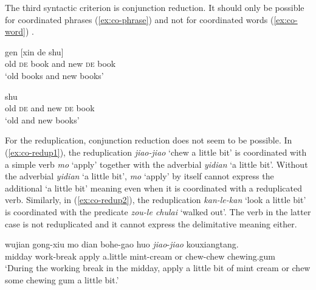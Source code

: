 The third syntactic criterion is conjunction reduction. It should only be possible for coordinated phrases (\ref{ex:co-phrase}) and not for coordinated words (\ref{ex:co-word}) \citetext{\citealp[137]{Duanmu1998}; \citealp[283]{Schaefer2009}}.

\settowidth{}

\ea\label{ex:co-phrase}
  \ea {} gen [xin de shu]\\
  old \textsc{de} book and new \textsc{de} book\\ 
  \glt `old books and new books'
  
  \ex {} shu\\
  old \textsc{de} and new \textsc{de} book\\ 
  \glt `old and new books'
   \z
\z

\ea\label{ex:co-word}
  
  \z
\z

For the reduplication, conjunction reduction does not seem to be possible. 
In (\ref{ex:co-redup1}), the reduplication \textit{jiao-jiao} `chew a little bit' is coordinated with a simple verb \textit{mo} `apply' together with the adverbial \textit{yidian} `a little bit'.
Without the adverbial \textit{yidian} `a little bit', \textit{mo} `apply' by itself cannot express the additional `a little bit' meaning even when it is coordinated with a reduplicated verb.
Similarly, in (\ref{ex:co-redup2}), the reduplication \textit{kan-le-kan} `look a little bit' is coordinated with the predicate \textit{zou-le chulai} `walked out'. The verb in the latter case is not reduplicated and it cannot express the delimitative meaning either.

\settowidth{}

\ea
  \ea\label{ex:co-redup1}
  \gll wujian gong-xiu mo dian bohe-gao huo \textit{jiao}-\textit{jiao} kouxiangtang.\\
    midday work-break apply a.little mint-cream or chew-chew chewing.gum\\ 
    \glt `During the working break in the midday, apply a little bit of mint cream or chew some chewing gum a little bit.'
    
